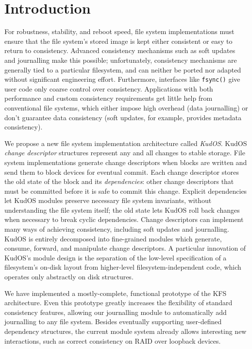 
\section*{Introduction}
\label{sec:intro}

For robustness, stability, and reboot speed, file system implementations
must ensure that the file system's stored image is kept either consistent
or easy to return to consistency.
%
Advanced consistency mechanisms such as soft updates~\cite{ganger00soft}
and journalling make this possible; unfortunately,
%
consistency mechanisms are generally tied to a particular filesystem, and
can neither be ported nor adapted without significant engineering
effort.
%
Furthermore, interfaces like \verb+fsync()+ give user code only coarse control
over consistency.
%
Applications with both performance and custom consistency requirements get
little help from conventional file systems, which either impose high overhead
(data journalling) or don't guarantee data consistency (soft updates, for
example, provides metadata consistency).



We propose a new file system implementation architecture called
\emph{KudOS}.
%
KudOS \emph{change descriptor} structures represent any and all changes to
stable storage.
%
File system implementations generate change descriptors when blocks are
written and send them to block devices for eventual commit.
%
Each change descriptor stores the old state of the block and its
\emph{dependencies}: other change descriptors that must be committed before
it is safe to commit this change.
%
Explicit dependencies let KudOS modules preserve necessary file system
invariants, without understanding the file system itself; the old state
lets KudOS roll back changes when necessary to break cyclic dependencies.
%
Change descriptors can implement many ways of achieving
consistency, including soft updates and journalling.
%
%
%
KudOS is entirely decomposed into fine-grained modules which generate,
consume, forward, and manipulate change descriptors.
%
A particular innovation of KudOS's module design is the separation of the
low-level specification of a filesystem's on-disk layout from higher-level
filesystem-independent code, which operates only abstractly on disk
structures.

We have implemented a mostly-complete, functional prototype of the KFS
architecture.  Even this prototype greatly increases the
flexibility of standard consistency features, allowing our journalling
module to automatically add journalling to any file system. 
%
%
Besides eventually supporting user-defined dependency structures, the
current module system already allows interesting new interactions, such as
correct consistency on RAID over loopback devices.
